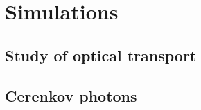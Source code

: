 %
%
%
%
%
%
%
%
%
%
%


\section{Simulations}

\subsection{Study of optical transport}
\subsection{Cerenkov photons}